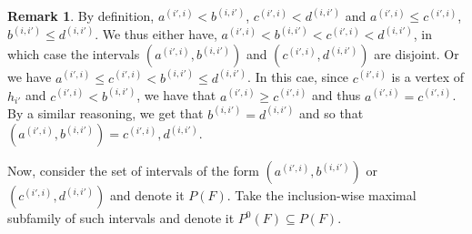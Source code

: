 \documentclass[12pt]{article}
\theoremstyle{definition}
\newtheorem{rmk}[thm]{Remark}
\def\rxone{1.0/2}
\def\ryone{0.7/2}
\def\rxonepoint{1.5/2}
\def\ryonepoint{0.9/2}
\def\rxtwo{2.0/2}
\def\rytwo{1.3/2}
\def\rxfivepoint{5.5/2}
\def\ryfivepoint{3.0/2}
\begin{document}
\begin{figure}[ht]
\begin{center}
{
     }
     \end{center}
     \caption{}
     \label{figure:overlap}
     \end{figure} 

     \begin{rmk} \label{rmk:disj}
      By definition,
     $a^{\left(i', i\right)} < b^{\left(i, i'\right)}$,
     $c^{\left(i', i\right)} < d^{\left(i,i'\right)}$ 
     and $a^{\left(i', i\right)} 
     \leq c^{\left(i', i\right)}$,
     $b^{\left(i, i'\right)}
     \leq d^{\left(i, i'\right)}$.
     We thus either have, 
     $a^{\left(i', i\right)} < 
     b^{\left(i, i'\right)} <
     c^{\left(i', i\right)} < 
     d^{\left(i, i'\right)}$,
     in which case
     the intervals
     $\left(a^{\left(i', i\right)},
     b^{\left(i,i'\right)}\right)$ 
     and
     $\left(c^{\left(i', i\right)},
     d^{\left(i,i'\right)}\right)$
     are disjoint.
     Or we have
     $a^{\left(i',i\right)} 
     \leq c^{\left(i', i\right)}
     < b^{\left(i, i'\right)}
     \leq d^{\left(i, i'\right)}$.
     In this cae, 
     since $c^{\left(i', i\right)}$ 
     is a vertex of
     $h_{i'}$ and
     $c^{\left(i', i\right)}
     < b^{\left(i, i'\right)}$, 
     we have that
     $a^{\left(i', i\right)}
     \geq c^{\left(i',i\right)}$ 
     and thus 
     $a^{\left(i', i\right)}
     = c^{\left(i',i\right)}$.
     By a similar
     reasoning, we get
     that $b^{\left(i,i'\right)}
     = d^{\left(i, i'\right)}$
     and so that
     $\left(a^{\left(i',i\right)},
     b^{\left(i, i'\right)}\right) =
     c^{\left(i',i\right)},
     d^{\left(i, i'\right)}$.
     \end{rmk}   

     Now, consider the set of intervals
     of the form $\left(a^{\left(i',i\right)},
     b^{\left(i,i'\right)}\right)$ 
     or $\left(c^{\left(i', i\right)},
     d^{\left(i, i'\right)}\right)$
     and denote it $P\left(F\right)$.
     Take the inclusion-wise maximal
     subfamily of such intervals
     and denote it $P^{0}\left(F\right)
     \subseteq P\left(F\right)$.
     
\end{document}
